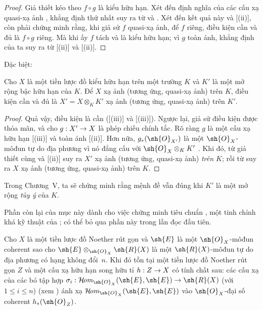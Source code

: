 \documentclass[oneside,10pt]{amsart}
\makeatletter
\renewcommand{\leq}{\leqslant}
\newcommand{\ega@arrow}[2]{\mathchoice{#1}{#2}{#2}{#2}}
\renewcommand{\to}{\ega@arrow{\longrightarrow}{\rightarrow}}
\def\shHom{\mathcal{H}\!\mathit{om}}
\let\EGAOriginalLabel\label
\renewcommand{\label}[1]{\phantomsection\EGAOriginalLabel{#1}}
\makeatother
\begin{document}
\begin{proof}
Giả thiết kéo theo $f\circ g$ là kiểu hữu hạn.
Xét đến định nghĩa của các cấu xạ quasi-xạ ảnh , khẳng định thứ nhất suy ra từ  và .
Xét đến kết quả này và [(ii)], còn phải chứng minh rằng, khi giả sử $f$ quasi-xạ ảnh, để $f$ riêng, điều kiện cần và đủ là $f\circ g$ riêng.
Mà khi ấy $f$ tách  và là kiểu hữu hạn;
vì $g$ toàn ánh, khẳng định của ta suy ra từ [(ii)] và [(ii)].
\end{proof}

Đặc biệt:

\begin{corollary}[6.6.5]
\label{II.6.6.5}
Cho $X$ là một tiền lược đồ kiểu hữu hạn trên một trường $K$ và $K'$ là một mở rộng bậc hữu hạn của $K$.
Để $X$ xạ ảnh (tương ứng, quasi-xạ ảnh) trên $K$, điều kiện cần và đủ là $X'=X\otimes_K K'$ xạ ảnh (tương ứng, quasi-xạ ảnh) trên $K'$.
\end{corollary}

\begin{proof}
Quả vậy, điều kiện là cần ([(iii)] và [(iii)]).
Ngược lại, giả sử điều kiện được thỏa mãn, và cho $g:X'\to X$ là phép chiếu chính tắc.
Rõ ràng $g$ là một cấu xạ hữu hạn [(iii)] và toàn ánh [(ii)].
Hơn nữa, $g_*(\sh{O}_{X'})$ là một $\sh{O}_X$-môđun tự do địa phương vì nó đẳng cấu với $\sh{O}_X\otimes_K K'$ .
Khi đó, từ giả thiết cùng  và [(ii)] suy ra $X'$ xạ ảnh (tương ứng, quasi-xạ ảnh) \emph{trên $K$};
rồi từ  suy ra $X$ xạ ảnh (tương ứng, quasi-xạ ảnh) trên $K$.
\end{proof}

Trong Chương~V, ta sẽ chứng minh rằng mệnh đề  vẫn đúng khi $K'$ là một mở rộng \emph{tùy ý} của $K$.

Phần còn lại của mục này dành cho việc chứng minh tiêu chuẩn , một tinh chỉnh khá kỹ thuật của ;
có thể bỏ qua phần này trong lần đọc đầu tiên.

\begin{lemma}[6.6.6]
\label{II.6.6.6}
Cho $X$ là một tiền lược đồ Noether rút gọn và $\sh{E}$ là một $\sh{O}_X$-môđun coherent sao cho $\sh{E}\otimes_{\sh{O}_X}\sh{R}(X)$ là một $\sh{R}(X)$-môđun tự do địa phương có hạng không đổi~$n$.
Khi đó tồn tại một tiền lược đồ Noether rút gọn $Z$ và một cấu xạ hữu hạn song hữu tỉ $h:Z\to X$ có tính chất sau: các cấu xạ của các bó tập hợp $\sigma_i:\shHom_{\sh{O}_X}(\sh{E},\sh{E})\to\sh{R}(X)$ (với $1\leq i\leq n$) (xem ) ánh xạ $\shHom_{\sh{O}_X}(\sh{E},\sh{E})$ vào $\sh{O}_X$-đại số coherent $h_*(\sh{O}_Z)$.
\end{lemma}
\end{document}
